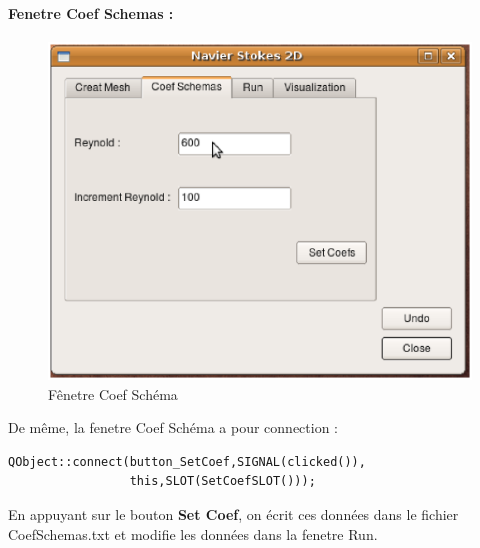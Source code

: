 \documentclass{book}
\begin{document}
\paragraph{Fenetre Coef Schemas :}
\begin{center}
\begin{figure}[h]
 \includegraphics[scale=0.50]{CoefSchema}
 \caption{Fênetre Coef Schéma} 
\end{figure}
\end{center}
De même, la fenetre Coef Schéma a pour connection :
\begin{lstlisting}
QObject::connect(button_SetCoef,SIGNAL(clicked()),
                 this,SLOT(SetCoefSLOT())); 
\end{lstlisting}
En appuyant sur le bouton \textbf{Set Coef}, on écrit ces données dans le fichier CoefSchemas.txt et modifie les données dans la fenetre Run.
\end{document}

